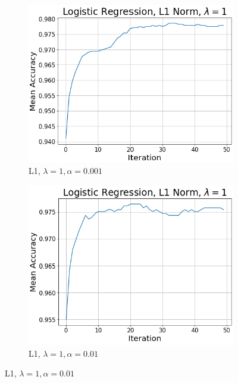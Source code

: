 \documentclass{article}
\begin{document}
\begin{enumerate}
    	\begin{figure}[h!]
     	\centering
     	\begin{subfigure}[b]{0.3\textwidth}
         	\centering
         	\includegraphics[width=\textwidth]
         	{Problem_2_3/logistic_L1_1.png}
         	\caption{L1, $\lambda=1,\alpha=0.001$}
         	\label{fig:LR_L1_1}
     	\end{subfigure}
     	\hfill
     	\begin{subfigure}[b]{0.3\textwidth}
         	\centering
         	\includegraphics[width=\textwidth]
         	{Problem_2_3/logistic_L1_2.png}
         	\caption{L1, $\lambda=1,\alpha=0.01$}
         	\label{fig:LR_L1_2}

\end{subfigure}
\end{figure}
\end{enumerate}
\end{document}

